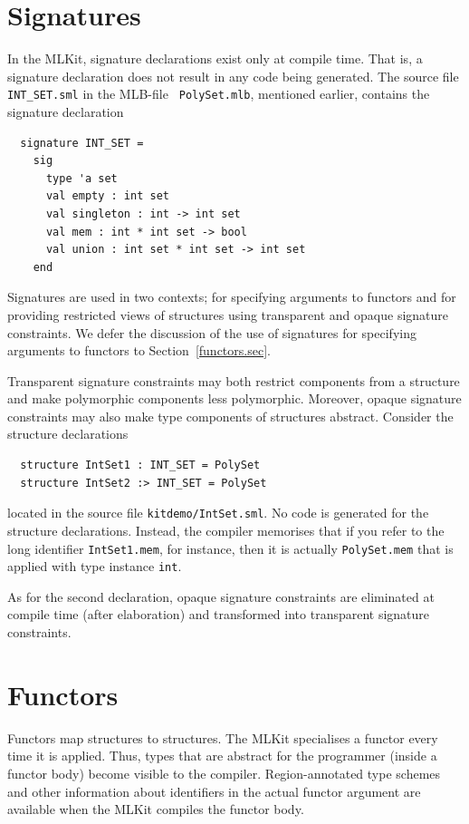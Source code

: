 \documentclass[12pt]{book}
\begin{document}
\section{Signatures}
%
In the MLKit, signature declarations exist only at compile time. That
is, a signature declaration does not result in any code being
generated. The source file {\tt INT\_SET.sml} in the MLB-file {\tt
  PolySet.mlb}, mentioned earlier, contains the signature declaration
\begin{verbatim}
  signature INT_SET =
    sig
      type 'a set
      val empty : int set
      val singleton : int -> int set
      val mem : int * int set -> bool
      val union : int set * int set -> int set
    end
\end{verbatim}

Signatures are used in two contexts; for specifying arguments to
functors and for providing restricted views of structures using
%
transparent and
%
opaque signature constraints. We defer the discussion of the use of
signatures for specifying arguments to functors to
Section~\ref{functors.sec}.

Transparent signature constraints may both restrict components from a
structure and make polymorphic components less polymorphic. Moreover,
opaque signature constraints may also make type components of
structures abstract. Consider the structure declarations
\begin{verbatim}
  structure IntSet1 : INT_SET = PolySet
  structure IntSet2 :> INT_SET = PolySet
\end{verbatim}

\noindent
located in the source file {\tt kitdemo/IntSet.sml}. No code is
generated for the structure declarations. Instead, the compiler
memorises that if you refer to the long identifier {\tt IntSet1.mem},
for instance, then it is actually {\tt PolySet.mem} that is applied
with type instance {\tt int}.

As for the second declaration, opaque signature constraints are
eliminated at compile time (after elaboration) and transformed into
transparent signature constraints.

\section{Functors \label{functors.sec}}
%
%
Functors map structures to structures. The MLKit specialises a functor
every time it is applied.  Thus, types that are abstract for the
programmer (inside a functor body) become visible to the compiler.
Region-annotated type schemes and other information about identifiers
in the actual functor argument are available when the MLKit compiles the
functor body.
\end{document}
